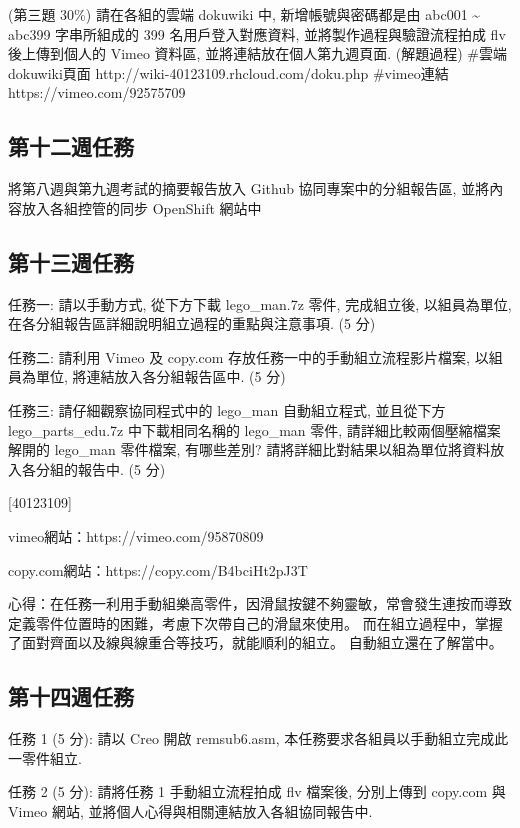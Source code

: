 \documentclass[]{article}
\begin{document}
(第三題 30\%) 請在各組的雲端 dokuwiki 中, 新增帳號與密碼都是由 abc001
\textasciitilde{} abc399 字串所組成的 399 名用戶登入對應資料,
並將製作過程與驗證流程拍成 flv 後上傳到個人的 Vimeo 資料區,
並將連結放在個人第九週頁面. (解題過程) \#雲端dokuwiki頁面
http://wiki-40123109.rhcloud.com/doku.php \#vimeo連結
https://vimeo.com/92575709

\subsection{第十二週任務}\label{ux7b2cux5341ux4e8cux9031ux4efbux52d9}

將第八週與第九週考試的摘要報告放入 Github 協同專案中的分組報告區,
並將內容放入各組控管的同步 OpenShift 網站中

\subsection{第十三週任務}\label{ux7b2cux5341ux4e09ux9031ux4efbux52d9}

任務一: 請以手動方式, 從下方下載 lego\_man.7z 零件, 完成組立後,
以組員為單位,在各分組報告區詳細說明組立過程的重點與注意事項. (5 分)

任務二: 請利用 Vimeo 及 copy.com 存放任務一中的手動組立流程影片檔案,
以組員為單位, 將連結放入各分組報告區中. (5 分)

任務三: 請仔細觀察協同程式中的 lego\_man 自動組立程式, 並且從下方
lego\_parts\_edu.7z 中下載相同名稱的 lego\_man 零件,
請詳細比較兩個壓縮檔案解開的 lego\_man 零件檔案, 有哪些差別?
請將詳細比對結果以組為單位將資料放入各分組的報告中. (5 分)

{[}40123109{]}

vimeo網站：https://vimeo.com/95870809

copy.com網站：https://copy.com/B4bciHt2pJ3T

心得：在任務一利用手動組樂高零件，因滑鼠按鍵不夠靈敏，常會發生連按而導致定義零件位置時的困難，考慮下次帶自己的滑鼠來使用。
而在組立過程中，掌握了面對齊面以及線與線重合等技巧，就能順利的組立。
自動組立還在了解當中。

\subsection{第十四週任務}\label{ux7b2cux5341ux56dbux9031ux4efbux52d9}

任務 1 (5 分): 請以 Creo 開啟 remsub6.asm,
本任務要求各組員以手動組立完成此一零件組立.

任務 2 (5 分): 請將任務 1 手動組立流程拍成 flv 檔案後, 分別上傳到
copy.com 與 Vimeo 網站, 並將個人心得與相關連結放入各組協同報告中.
\end{document}
